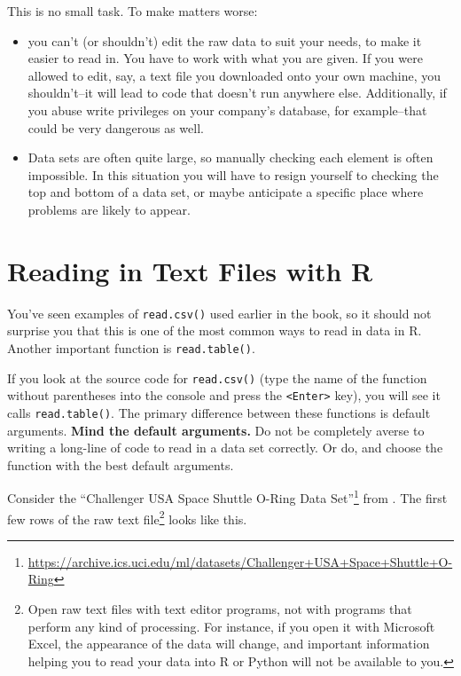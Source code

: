 \documentclass[12pt,krantz2]{krantz}
\renewcommand{\href}[2]{#2\footnote{\url{#1}}}
\begin{document}
This is no small task. To make matters worse:

\begin{itemize}
\item
  you can't (or shouldn't) edit the raw data to suit your needs, to make it easier to read in. You have to work with what you are given. If you were allowed to edit, say, a text file you downloaded onto your own machine, you shouldn't--it will lead to code that doesn't run anywhere else. Additionally, if you abuse write privileges on your company's database, for example--that could be very dangerous as well.
\item
  Data sets are often quite large, so manually checking each element is often impossible. In this situation you will have to resign yourself to checking the top and bottom of a data set, or maybe anticipate a specific place where problems are likely to appear.
\end{itemize}

\hypertarget{reading-in-text-files-with-r}{%
\section{Reading in Text Files with R}\label{reading-in-text-files-with-r}}

You've seen examples of \texttt{read.csv()} used earlier in the book, so it should not surprise you that this is one of the most common ways to read in data in R. Another important function is \texttt{read.table()}.

If you look at the source code for \texttt{read.csv()} (type the name of the function without parentheses into the console and press the \texttt{\textless{}Enter\textgreater{}} key), you will see it calls \texttt{read.table()}. The primary difference between these functions is default arguments. \textbf{Mind the default arguments.} Do not be completely averse to writing a long-line of code to read in a data set correctly. Or do, and choose the function with the best default arguments.

Consider the \href{https://archive.ics.uci.edu/ml/datasets/Challenger+USA+Space+Shuttle+O-Ring}{``Challenger USA Space Shuttle O-Ring Data Set''} from \citep{uci_data}. The first few rows of the raw text file\footnote{Open raw text files with text editor programs, not with programs that perform any kind of processing. For instance, if you open it with Microsoft Excel, the appearance of the data will change, and important information helping you to read your data into R or Python will not be available to you.} looks like this.
\end{document}

